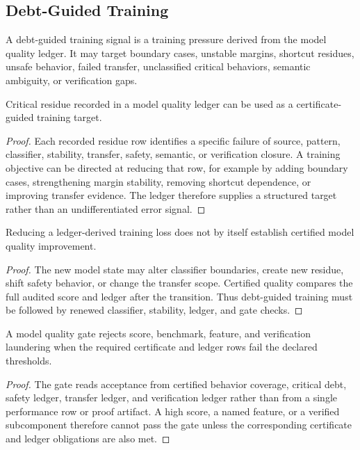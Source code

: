 \subsection{Debt-Guided Training}
\label{subsec:philosophy-certified-model-quality-debt-guided-training}

\begin{definition}
\label{def:philosophy-debt-guided-training-signal}
A debt-guided training signal is a training pressure derived from the
model quality ledger. It may target boundary cases, unstable margins,
shortcut residues, unsafe behavior, failed transfer, unclassified
critical behaviors, semantic ambiguity, or verification gaps.
\end{definition}

\begin{theorem}
\label{thm:philosophy-ledger-rows-define-training-targets}
Critical residue recorded in a model quality ledger can be used as a
certificate-guided training target.
\end{theorem}
\begin{proof}
Each recorded residue row identifies a specific failure of source,
pattern, classifier, stability, transfer, safety, semantic, or
verification closure. A training objective can be directed at reducing
that row, for example by adding boundary cases, strengthening margin
stability, removing shortcut dependence, or improving transfer evidence.
The ledger therefore supplies a structured target rather than an
undifferentiated error signal.
\end{proof}

\begin{theorem}
\label{thm:philosophy-debt-guided-training-needs-recertification}
Reducing a ledger-derived training loss does not by itself establish
certified model quality improvement.
\end{theorem}
\begin{proof}
The new model state may alter classifier boundaries, create new
residue, shift safety behavior, or change the transfer scope. Certified
quality compares the full audited score and ledger after the transition.
Thus debt-guided training must be followed by renewed classifier,
stability, ledger, and gate checks.
\end{proof}

\begin{theorem}
\label{thm:philosophy-model-quality-gate-blocks-laundering}
A model quality gate rejects score, benchmark, feature, and verification
laundering when the required certificate and ledger rows fail the
declared thresholds.
\end{theorem}
\begin{proof}
The gate reads acceptance from certified behavior coverage, critical
debt, safety ledger, transfer ledger, and verification ledger rather
than from a single performance row or proof artifact. A high score, a
named feature, or a verified subcomponent therefore cannot pass the gate
unless the corresponding certificate and ledger obligations are also
met.
\end{proof}

